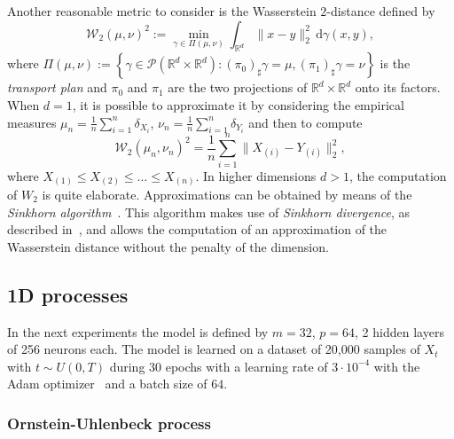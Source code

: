 \documentclass[12pt]{article}
\theoremstyle{remark}
\theoremstyle{plain}
\numberwithin{equation}{section}
\newcommand{\dd}{\ensuremath{\,\mathrm d}}
\newcommand{\R}{\mathbb{R}}
\begin{document}
Another reasonable metric to consider is the Wasserstein $2$-distance defined by
\begin{equation*}
    \mathcal W_2(\mu, \nu)^2 := \min_{\gamma \in \Pi(\mu, \nu)}\int_{\R^d}\|x-y\|_2^2 \dd\gamma(x,y),
\end{equation*}
where $\Pi(\mu,\nu) := \left\{\gamma \in \mathcal P(\R^d \times \R^d) : (\pi_0)_\sharp \gamma = \mu, (\pi_1)_\sharp \gamma = \nu \right\}$ is the \textit{transport plan} and $\pi_0$ and $\pi_1$ are the two projections of $\R^d \times \R^d$ onto its factors.
When $d=1$, it is possible to approximate it by considering the empirical measures $\mu_n = \frac 1 n \sum_{i=1}^n \delta_{X_i}$, $\nu_n = \frac 1 n \sum_{i=1}^n \delta_{Y_i}$ and then to compute
\begin{equation*}
    \mathcal W_2(\mu_n, \nu_n)^2 = \frac 1 n \sum_{i=1}^n \|X_{(i)} - Y_{(i)}\|_2^2,
\end{equation*}
where $X_{(1)} \leq X_{(2)} \leq \dots \leq X_{(n)}$.
In higher dimensions $d > 1$, the computation of $W_2$ is quite elaborate.
Approximations can be obtained by means of the \emph{Sinkhorn algorithm}~\cite{NIPS2013_af21d0c9,chizat2020faster}.
This algorithm makes use of \emph{Sinkhorn divergence}, as described in~\cite{chizat2020faster}, and allows the computation of an approximation of the Wasserstein distance without the penalty of the dimension.
\subsection{1D processes}
\label{sec:1D}

In the next experiments the model is defined by $m=32$, $p=64$, 2 hidden layers of 256 neurons each.
The model is learned on a dataset of 20,000 samples of $X_t$ with $t \sim U(0, T)$ during 30 epochs with a learning rate of $3\cdot 10^{-4}$ with the Adam optimizer~\cite{Kingma2014AdamAM} and a batch size of $64$.

\subsubsection{Ornstein-Uhlenbeck process}
\label{sec:OU}
\end{document}
